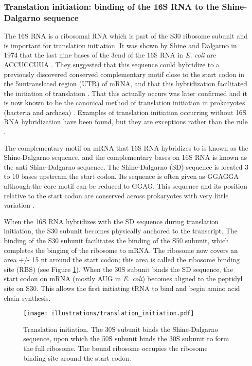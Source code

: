 \subsubsection{Translation initiation: binding of the 16S RNA to the
Shine-Dalgarno sequence}
The 16S RNA is a ribosomal RNA which is part of the S30 ribosome subunit and is
important for translation initiation. It was shown by Shine and Dalgarno in
1974 that the last nine bases of the 3\ppp end of the 16S RNA in \textit{E.
coli} are ACCUCCUUA \cite{shine_3-terminal_1974}. They suggested that this
sequence could hybridize to a previously discovered conserved complementary
motif close to the start codon in the 5\ppp untranslated region (UTR) of mRNA,
and that this hybridization facilitated the initiation of translation
\cite{shine_3-terminal_1974}. That this actually occurs was later confirmed and
it is now known to be the canonical method of translation initiation in
prokaryotes (bacteria and archaea) \cite{nakagawa_dynamic_2010}. Examples of
translation initiation occurring without 16S RNA hybridization have been found,
but they are exceptions rather than the rule \cite{skorski_highly_2006,
boni_non-canonical_2001}.

The complementary motif on mRNA that 16S RNA hybridizes to is known as the
Shine-Dalgarno sequence, and the complementary bases on 16S RNA is known as the
anti Shine-Dalgarno sequence. The Shine-Dalgarno (SD) sequence is located 3 to
10 bases upstream the start codon. Its sequence is often given as GGAGGA
although the core motif can be reduced to GGAG. This sequence and its position
relative to the start codon are conserved across prokaryotes with very little
variation \cite{nakagawa_dynamic_2010}. 

When the 16S RNA hybridizes with the SD sequence during translation initiation,
the S30 subunit becomes physically anchored to the transcript. The binding of
the S30 subunit facilitates the binding of the S50 subunit, which completes the
binging of the ribosome to mRNA. The ribosome now covers an area +/- 15 nt
around the start codon; this area is called the ribosome binding site (RBS)
\cite{kozak_regulation_2005} (see Figure \ref{fig:translation_initiation}).
When the 30S subunit binds the SD sequence, the start codon on mRNA (mostly AUG
in \textit{E. coli}) becomes aligned to the peptidyl site on S30. This allows
the first initiating tRNA to bind and begin amino acid chain synthesis.
\begin{figure}[htb]
	\begin{center}
		\texttt{[image: illustrations/translation\_initiation.pdf]}
	\end{center}
	\caption{Translation initiation. The 30S subunit binds the Shine-Dalgarno
	sequence, upon which the 50S subunit binds the 30S subunit to form the full
	ribosome. The bound ribosome occupies the ribosome binding site around the
	start codon.}
	\label{fig:translation_initiation}
\end{figure}

